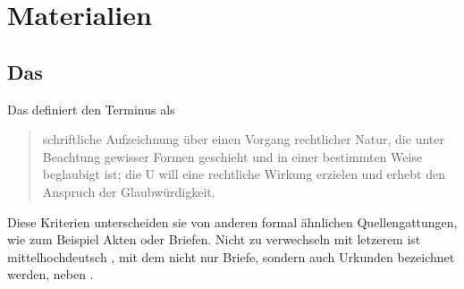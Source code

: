\chapter{Materialien}
\label{ch:materialien}

\section%
	{Das }
\label{sec:materialcao}

Das  definiert den Terminus
 als \blockcquote[574]{frenz1998a}{schriftliche Aufzeichnung
über einen Vorgang rechtlicher Natur, die unter Beachtung gewisser Formen
geschieht und in einer bestimmten Weise beglaubigt ist; die U
will eine rechtliche Wirkung erzielen und erhebt den Anspruch der
Glaubwürdigkeit.}

Diese Kriterien unterscheiden sie von anderen formal ähnlichen
Quellengattungen, wie zum Beispiel Akten oder Briefen. Nicht zu verwechseln mit
letzerem ist mittelhochdeutsch , mit dem
nicht nur Briefe, sondern auch Urkunden bezeichnet werden, neben
\autocites[][s.\,v.~]{mwb1}[][s.\,v.~]{mwb2}[vgl.
auch][]{schmidtwiegand1998a}.

